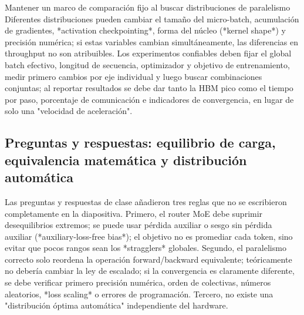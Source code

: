 \begin{warningbox}{Mantener un marco de comparación fijo al buscar distribuciones de paralelismo}
Diferentes distribuciones pueden cambiar el tamaño del micro-batch, acumulación de gradientes, *activation checkpointing*, forma del núcleo (*kernel shape*) y precisión numérica; si estas variables cambian simultáneamente, las diferencias en throughput no son atribuibles. Los experimentos confiables deben fijar el global batch efectivo, longitud de secuencia, optimizador y objetivo de entrenamiento, medir primero cambios por eje individual y luego buscar combinaciones conjuntas; al reportar resultados se debe dar tanto la HBM pico como el tiempo por paso, porcentaje de comunicación e indicadores de convergencia, en lugar de solo una "velocidad de aceleración".
\end{warningbox}

\subsection{Preguntas y respuestas: equilibrio de carga, equivalencia matemática y distribución automática}

Las preguntas y respuestas de clase añadieron tres reglas que no se escribieron completamente en la diapositiva. Primero, el router MoE debe suprimir desequilibrios extremos; se puede usar pérdida auxiliar o sesgo sin pérdida auxiliar (*auxiliary-loss-free bias*); el objetivo no es promediar cada token, sino evitar que pocos rangos sean los *stragglers* globales. Segundo, el paralelismo correcto solo reordena la operación forward/backward equivalente; teóricamente no debería cambiar la ley de escalado; si la convergencia es claramente diferente, se debe verificar primero precisión numérica, orden de colectivas, números aleatorios, *loss scaling* o errores de programación. Tercero, no existe una "distribución óptima automática" independiente del hardware.



